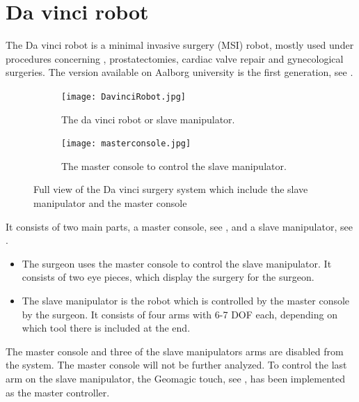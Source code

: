 \section{Da vinci robot}\label{sec:da_vin_rob}

The Da vinci robot is a minimal invasive surgery (MSI) robot, mostly used under procedures concerning , prostatectomies, cardiac valve repair and gynecological surgeries. The version available on Aalborg university is the first generation, see .

\begin{figure}[H]
	\centering
	\begin{subfigure}{.45\textwidth}
		\centering
		\texttt{[image: DavinciRobot.jpg]}
		\caption{The da vinci robot or slave manipulator.}
		\label{fig:davincirobot}
	\end{subfigure}
	\begin{subfigure}{.45\textwidth}
		\centering
		\vspace{12pt}
		\texttt{[image: masterconsole.jpg]}
		\caption{The master console to control the slave manipulator.}
		\label{fig:mastermani}
	\end{subfigure}
\caption{Full view of the Da vinci surgery system which include the slave manipulator and the master console}
\label{fig:fulldavinci}
\end{figure}

It consists of two main parts, a master console, see , and a slave manipulator, see .

\begin{itemize}
\item The surgeon uses the master console to control the slave manipulator. It consists of two eye pieces, which display the surgery for the surgeon. 
\item The slave manipulator is the robot which is controlled by the master console by the surgeon. It consists of four arms with 6-7 \gls{DOF} each, depending on which tool there is included at the end.
\end{itemize}

The master console and three of the slave manipulators arms are disabled from the system. The master console will not be further analyzed. To control the last arm on the slave manipulator, the Geomagic touch, see , has been implemented as the master controller.




